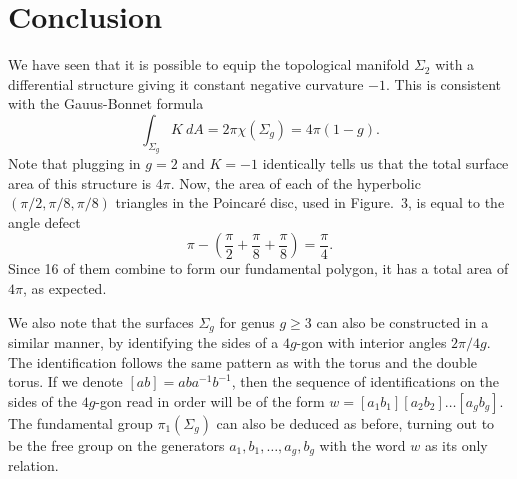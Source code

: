 \documentclass[12pt]{article}
\theoremstyle{definition}
\theoremstyle{remark}
\begin{document}
    \section{Conclusion}

    We have seen that it is possible to equip the topological manifold $\Sigma_2$
    with a differential structure giving it constant negative curvature $-1$. This is
    consistent with the Gauus-Bonnet formula \[
        \int_{\Sigma_g} K\:dA = 2\pi\chi(\Sigma_g) = 4\pi(1 - g).
    \] Note that plugging in $g = 2$ and $K = -1$ identically tells us that the total
    surface area of this structure is $4\pi$. Now, the area of each of the hyperbolic
    $(\pi / 2, \pi / 8, \pi / 8)$ triangles in the Poincar\'e disc, used in
    Figure.~3, is equal to the angle defect \[
        \pi - \left(\frac{\pi}{2} + \frac{\pi}{8} + \frac{\pi}{8}\right) =
        \frac{\pi}{4}.
    \] Since 16 of them combine to form our fundamental polygon, it has a total area
    of $4\pi$, as expected.

    We also note that the surfaces $\Sigma_g$ for genus $g \geq 3$ can also be
    constructed in a similar manner, by identifying the sides of a $4g$-gon with
    interior angles $2\pi / 4g$. The identification follows the same pattern as with
    the torus and the double torus. If we denote $[ab] = aba^{-1}b^{-1}$, then the
    sequence of identifications on the sides of the $4g$-gon read in order will be of
    the form $w = [a_1b_1][a_2b_2] \dots [a_g b_g]$. The fundamental group
    $\pi_1(\Sigma_g)$ can also be deduced as before, turning out to be the free group
    on the generators $a_1, b_1, \dots, a_g, b_g$ with the word $w$ as its only
    relation.


    
    
\end{document}
